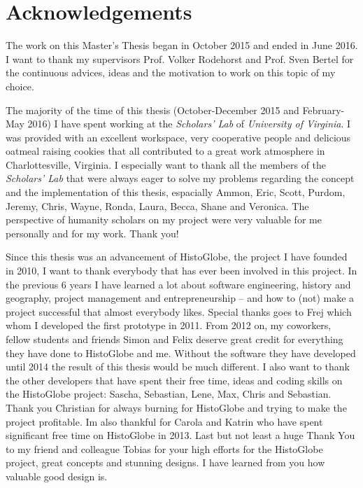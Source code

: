 
\section*{Acknowledgements} %
\label{cha:acknowledgements}

The work on this Master's Thesis began in October 2015 and ended in June 2016. I want to thank my supervisors Prof. Volker Rodehorst and Prof. Sven Bertel for the continuous advices, ideas and the motivation to work on this topic of my choice.

The majority of the time of this thesis (October-December 2015 and February-May 2016) I have spent working at the \emph{Scholars' Lab} of \emph{University of Virginia}. I was provided with an excellent workspace, very cooperative people and delicious oatmeal raising cookies that all contributed to a great work atmosphere in Charlottesville, Virginia. I especially want to thank all the members of the \emph{Scholars' Lab} that were always eager to solve my problems regarding the concept and the implementation of this thesis, espacially Ammon, Eric, Scott, Purdom, Jeremy, Chris, Wayne, Ronda, Laura, Becca, Shane and Veronica. The perspective of humanity scholars on my project were very valuable for me personally and for my work. Thank you!

Since this thesis was an advancement of HistoGlobe, the project I have founded in 2010, I want to thank everybody that has ever been involved in this project. In the previous 6 years I have learned a lot about software engineering, history and geography, project management and entrepreneurship -- and how to (not) make a project successful that almost everybody likes. Special thanks goes to Frej which whom I developed the first prototype in 2011. From 2012 on, my coworkers, fellow students and friends Simon and Felix deserve great credit for everything they have done to HistoGlobe and me. Without the software they have developed until 2014 the result of this thesis would be much different. I also want to thank the other developers that have spent their free time, ideas and coding skills on the HistoGlobe project: Sascha, Sebastian, Lene, Max, Chris and Sebastian. Thank you Christian for always burning for HistoGlobe and trying to make the project profitable. Im also thankful for Carola and Katrin who have spent significant free time on HistoGlobe in 2013. Last but not least a huge Thank You to my friend and colleague Tobias for your high efforts for the HistoGlobe project, great concepts and stunning designs. I have learned from you how valuable good design is.

